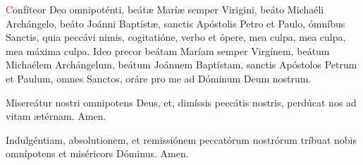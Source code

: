 \textcolor{red}{C}onfíteor Deo omnipoténti, beát{\ae} Marí{\ae} semper Virigini, beáto Michaéli Archángelo, beáto Joánni Baptíst{\ae}, sanctis 
Apóstolis Petro et Paulo, ómníbus Sanctis, quia peccávi nimis, cogitatióne, verbo et ópere, mea culpa, mea culpa, mea máxima culpa. Ideo precor beátam
Maríam semper Virgínem, beátum Michaélem Archángelum, beátum Joánnem Baptístam, sanctis Apóstolos Petrum et Paulum, omnes Sanctos,
oráre pro me ad Dóminum Deum nostrum.

Misereátur nostri omnipotens Deus, et, dimíssis peccátis nostris, perdúcat nos ad vitam {\ae}térnam. Amen.

Indulgéntiam, absolutionem, et remissiónem peccatórum nostrórum tríbuat nobis omnípotens et miséricors Dóminus. Amen.